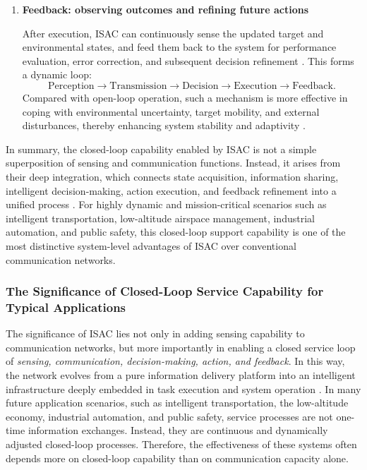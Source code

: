 \begin{enumerate}[label=(\arabic*)]
\item \textbf{Feedback: observing outcomes and refining future actions}

After execution, ISAC can continuously sense the updated target and environmental states, and feed them back to the system for performance evaluation, error correction, and subsequent decision refinement \cite{Zhang2021ISAC6G}. This forms a dynamic loop:
\[
\text{Perception} \rightarrow \text{Transmission} \rightarrow \text{Decision} \rightarrow \text{Execution} \rightarrow \text{Feedback}.
\]
Compared with open-loop operation, such a mechanism is more effective in coping with environmental uncertainty, target mobility, and external disturbances, thereby enhancing system stability and adaptivity \cite{Saad2020Vision6G}.
\end{enumerate}

In summary, the closed-loop capability enabled by ISAC is not a simple superposition of sensing and communication functions. Instead, it arises from their deep integration, which connects state acquisition, information sharing, intelligent decision-making, action execution, and feedback refinement into a unified process \cite{Liu2022ISAC, Feng2020JointRadarCommunication}. For highly dynamic and mission-critical scenarios such as intelligent transportation, low-altitude airspace management, industrial automation, and public safety, this closed-loop support capability is one of the most distinctive system-level advantages of ISAC over conventional communication networks.

\subsubsection{The Significance of Closed-Loop Service Capability for Typical Applications}
\label{subsubsec:ch1-isac-core value-closed loop-applications}

The significance of ISAC lies not only in adding sensing capability to communication networks, but more importantly in enabling a closed service loop of \emph{sensing, communication, decision-making, action, and feedback}. In this way, the network evolves from a pure information delivery platform into an intelligent infrastructure deeply embedded in task execution and system operation \cite{Liu2022ISAC, Zhang2021ISAC6G, Saad2020Vision6G, ITU2030}.  
In many future application scenarios, such as intelligent transportation, the low-altitude economy, industrial automation, and public safety, service processes are not one-time information exchanges. Instead, they are continuous and dynamically adjusted closed-loop processes. Therefore, the effectiveness of these systems often depends more on closed-loop capability than on communication capacity alone.

